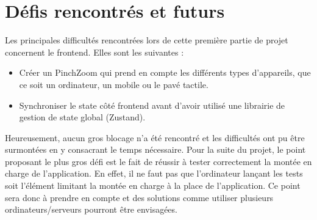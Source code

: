 \section{Défis rencontrés et futurs}

Les principales difficultés rencontrées lors de cette première partie de projet concernent le frontend. Elles sont les suivantes :

\begin{itemize}
  \item Créer un PinchZoom qui prend en compte les différents types d'appareils, que ce soit un ordinateur, un mobile ou le pavé tactile.
  \item Synchroniser le state côté frontend avant d'avoir utilisé une librairie de gestion de state global (Zustand).
\end{itemize}

Heureusement, aucun gros blocage n'a été rencontré et les difficultés ont pu être surmontées en y consacrant le temps nécessaire. Pour la suite du projet, le point proposant le plus gros défi est le fait de réussir à tester correctement la montée en charge de l'application. En effet, il ne faut pas que l'ordinateur lançant les tests soit l'élément limitant la montée en charge à la place de l'application. Ce point sera donc à prendre en compte et des solutions comme utiliser plusieurs ordinateurs/serveurs pourront être envisagées.

\vfil
\hspace{8cm}\makeatletter\@author\makeatother\par
\hspace{8cm}\begin{minipage}{5cm}
\end{minipage}
